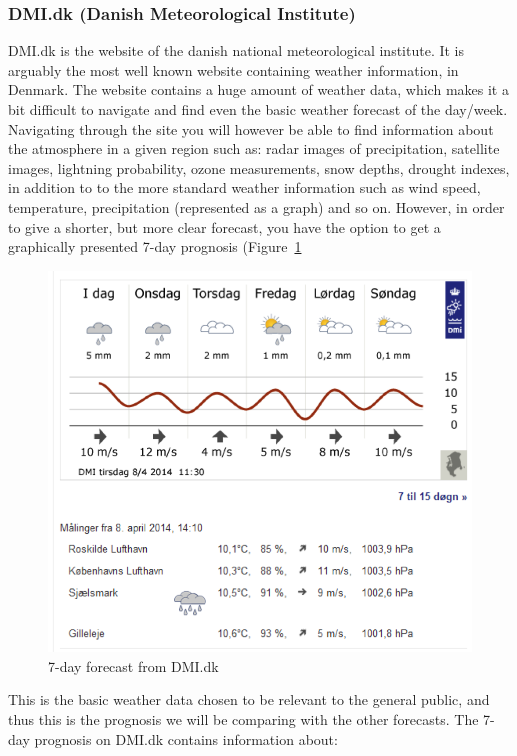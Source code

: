 
\FloatBarrier
\subsubsection*{DMI.dk (Danish Meteorological Institute)} %
\label{ssub:dmi_dk_danish_meteorological_institute_}

DMI.dk is the website of the danish national meteorological institute. 
It is arguably the most well known website containing weather information, in Denmark. 
The website contains a huge amount of weather data, which makes it a bit difficult to navigate and find even the basic weather forecast of the day/week. 
Navigating through the site you will however be able to find information about the atmosphere in a given region such as: radar images of precipitation, satellite images, lightning probability, ozone measurements, snow depths, drought indexes, in addition to to the more standard weather information such as wind speed, temperature, precipitation (represented as a graph) and so on. 
However, in order to give a shorter, but more clear forecast, you have the option to get a graphically presented 7-day prognosis (Figure~\ref{fig:dmi1}

\begin{figure}[!htbp]
     \centering
     \includegraphics[width=.75\textwidth]{images/Dmi1.png}
     \caption{7-day forecast from DMI.dk}
     \label{fig:dmi1}
 \end{figure}

This is the basic weather data chosen to be relevant to the general public, and thus this is the prognosis we will be comparing with the other forecasts. 
The 7-day prognosis on DMI.dk contains information about:

